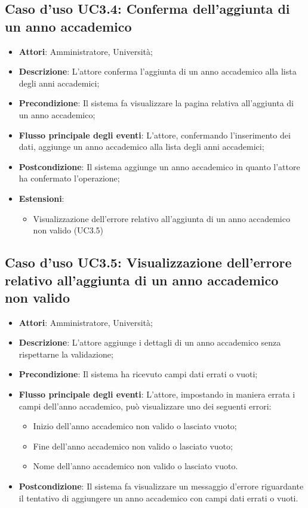 \subsection{Caso d'uso \texorpdfstring{UC3.4}{UC3.4}: Conferma dell'aggiunta di un anno accademico}
\begin{itemize}
\item \textbf{Attori}: Amministratore, Università;
\item \textbf{Descrizione}: L'attore conferma l'aggiunta di un anno accademico alla lista degli anni accademici;
\item \textbf{Precondizione}: Il sistema fa visualizzare la pagina relativa all'aggiunta di un anno accademico;
\item \textbf{Flusso principale degli eventi}: L'attore, confermando l'inserimento dei dati, aggiunge un anno accademico alla lista degli anni accademici;
\item \textbf{Postcondizione}: Il sistema aggiunge un anno accademico in quanto l'attore ha confermato l'operazione;
\item \textbf{Estensioni}:
\begin{itemize}
\item Visualizzazione dell'errore relativo all'aggiunta di un anno accademico non valido (UC3.5)
\end{itemize}
\end{itemize}
\subsection{Caso d'uso \texorpdfstring{UC3.5}{UC3.5}: Visualizzazione dell'errore relativo all'aggiunta di un anno accademico non valido}
\begin{itemize}
\item \textbf{Attori}: Amministratore, Università;
\item \textbf{Descrizione}: L'attore aggiunge i dettagli di un anno accademico senza rispettarne la validazione;
\item \textbf{Precondizione}: Il sistema ha ricevuto campi dati errati o vuoti;
\item \textbf{Flusso principale degli eventi}: L'attore, impostando in maniera errata i campi dell'anno accademico, può visualizzare uno dei seguenti errori:
\begin{itemize}
\item Inizio dell'anno accademico non valido o lasciato vuoto;
\item Fine dell'anno accademico non valido o lasciato vuoto;
\item Nome dell'anno accademico non valido o lasciato vuoto.
\end{itemize}
\item \textbf{Postcondizione}: Il sistema fa visualizzare un messaggio d'errore riguardante il tentativo di aggiungere un anno accademico con campi dati errati o vuoti.
\end{itemize}
